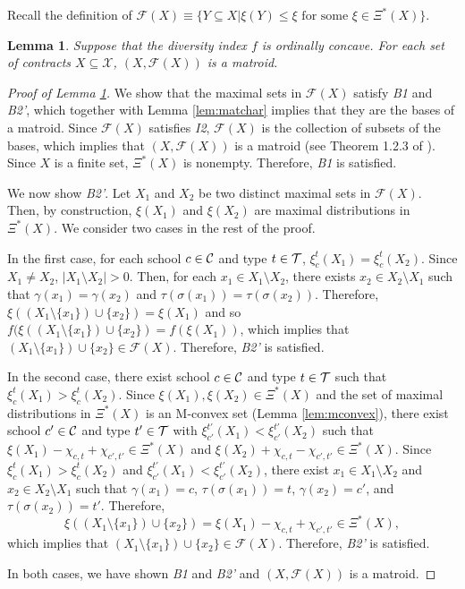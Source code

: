 \documentclass[12pt]{amsart}
\newtheorem{lemma}{Lemma}
\theoremstyle{remark}
\def\oconcave{ordinally concave} %
\begin{document}
Recall the definition of $\mathcal{F}(X) \equiv \{Y \subseteq X | \xi(Y) \leq \xi \mbox{ for some } \xi \in \Xi^*(X)\}$.

\begin{lemma}\label{lem:matroid}
Suppose that the diversity index $f$ is \oconcave{}.
For each set of contracts $X\subseteq \mathcal{X}$, $(X,\mathcal{F}(X))$ is a matroid.
\end{lemma}

\begin{proof}[Proof of Lemma \ref{lem:matroid}]\renewcommand{\qedsymbol}{$\blacksquare$}
We show that the maximal sets in $\mathcal{F}(X)$ satisfy \emph{B1} and \emph{B2'},
which together with Lemma \ref{lem:matchar} implies that they are the bases of a matroid. Since $\mathcal{F}(X)$ satisfies \emph{I2}, $\mathcal{F}(X)$ is the collection of subsets of the bases, which implies that $(X,\mathcal{F}(X))$ is a matroid (see Theorem 1.2.3 of \cite{oxley}).
Since $X$ is a finite set, $\Xi^*(X)$ is nonempty. Therefore, \emph{B1} is satisfied.

We now show \emph{B2'}. Let $X_1$ and $X_2$ be two distinct maximal sets in $\mathcal{F}(X)$. Then, by construction, $\xi(X_1)$ and $\xi(X_2)$ are
maximal distributions in $\Xi^*(X)$. %
We consider two cases in the rest of the proof.

In the first case, for each school $c\in \mathcal{C}$ and type $t\in \mathcal{T}$, $\xi_c^t(X_1)=\xi_c^t(X_2)$.
Since $X_1 \neq X_2$, $|X_1 \setminus X_2|>0$. Then,
for each $x_1 \in X_1 \setminus X_2$,
there exists $x_2 \in X_2 \setminus X_1$ such that
$\gamma(x_1)=\gamma(x_2)$ and $\tau(\sigma(x_1))=\tau(\sigma(x_2))$. Therefore, $\xi((X_1\setminus \{x_1\}) \cup \{x_2\})=\xi(X_1)$ and so $f(\xi((X_1\setminus \{x_1\})\cup \{x_2\})=f(\xi(X_1))$,
which implies that $(X_1\setminus \{x_1\})\cup \{x_2\}\in \mathcal{F}(X)$. Therefore, \emph{B2'} is satisfied.

In the second case, there exist school $c\in \mathcal{C}$ and type $t\in \mathcal{T}$ such that
$\xi_c^t(X_1)>\xi_c^t(X_2)$. Since $\xi(X_1),\xi(X_2) \in \Xi^*(X)$ and
the set of maximal distributions in $\Xi^*(X)$ is an M-convex set (Lemma \ref{lem:mconvex}),
there exist school $c'\in \mathcal{C}$ and type $t'\in \mathcal{T}$  with $\xi_{c'}^{t'}(X_1)<\xi_{c'}^{t'}(X_2)$ such that
$\xi(X_1)-\chi_{c,t}+\chi_{c',t'} \in \Xi^*(X)$ and
$\xi(X_2)+\chi_{c,t}-\chi_{c',t'} \in \Xi^*(X)$. Since $\xi_c^t(X_1)>\xi_c^t(X_2)$ and $\xi_{c'}^{t'}(X_1)<\xi_{c'}^{t'}(X_2)$, there exist
$x_1 \in X_1 \setminus X_2$ and $x_2 \in X_2 \setminus X_1$ such that
$\gamma(x_1)=c$, $\tau(\sigma(x_1))=t$, $\gamma(x_2)=c'$,
and $\tau(\sigma(x_2))=t'$. Therefore,
\[\xi((X_1\setminus \{x_1\})\cup \{x_2\})=\xi(X_1)-\chi_{c,t}+\chi_{c',t'}\in \Xi^*(X),\]
which implies that $(X_1\setminus \{x_1\})\cup \{x_2\} \in \mathcal{F}(X)$.
Therefore, \emph{B2'} is satisfied.

In both cases, we have shown \emph{B1} and \emph{B2'} and $(X,\mathcal{F}(X))$ is a matroid.
\end{proof}
\end{document}
